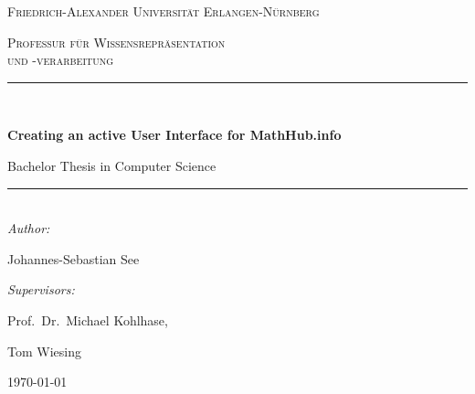 \documentclass[11pt,a4paper]{article}
\date{\today}
\begin{document}
\thispagestyle{empty}
\begin{titlepage}
	\centering
	{\scshape\huge Friedrich-Alexander Universität Erlangen-Nürnberg \par}
	\vspace{0.75cm}
	{\scshape\Large Professur für Wissensrepräsentation \\und -verarbeitung\par}
  \vspace{0.75cm}
  \rule{14cm}{1pt} \\
  {\Huge\bfseries Creating an active User Interface for MathHub.info \par}
  \vspace{0.4cm}
  {\Large Bachelor Thesis in Computer Science\par}
  \rule{14cm}{1pt} \\
  \vspace{0.4cm}
  {\large\itshape Author:} \\
	{\Large Johannes-Sebastian See\par}
	\vspace{0.4cm}
	{\large\itshape Supervisors:\par}
	{\large Prof.~Dr.~Michael Kohlhase,\par
	Tom Wiesing\par}
	\vspace{0.4cm}
	{\large \today\par}

\end{titlepage}
\end{document}
